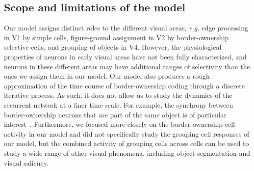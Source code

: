 \documentclass[12pt]{article}
\newcommand{\eg}[0]{{\em e.g.}\xspace}
\begin{document}
\subsection{Scope and limitations of the model}
Our model assigns distinct roles to the
different visual areas,  \eg edge processing in V1 by simple cells, figure-ground
assignment in V2 by border-ownership selective cells, and grouping of objects in V4. However,
the physiological properties of neurons in early visual areas have not
been fully characterized, and 
neurons in these different
areas may have 
additional ranges of selectivity
than the ones we assign them in our model. 
Our model also produces a rough approximation of the time course of border-ownership
coding through a discrete iterative process. As such, it does not allow us to study the dynamics of the recurrent network at a finer time scale. For example, the synchrony between border-ownership neurons that are part of the same object is of particular interest~\citep{Martin_vonderHeydt15,Wagatsuma_etal16a}. Furthermore, we focused more closely on the border-ownership cell activity in our model and did not specifically study the grouping cell responses of our model, but the combined activity of grouping cells across cells can be used to
study a wide range of other visual phenomena, including object segmentation and visual saliency.


\clearpage


%
%
\end{document}
